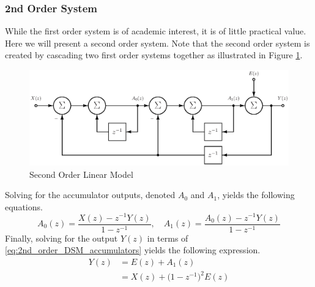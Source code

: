 \subsubsection{2nd Order System}
While the first order system is of academic interest, it is of little
practical value. Here we will present a second order system. Note that the
second order system is created by cascading two first order systems
together as illustrated in Figure \ref{fig:linear_z_model_2nd_order}.
\begin{figure}
  \centering
  \includegraphics[width=\textwidth]{./final_figures/second_order_simple_model.eps}
  \caption{Second Order Linear Model}
  \label{fig:linear_z_model_2nd_order}
\end{figure}
Solving for the accumulator outputs, denoted $A_{0}$ and $A_{1}$, yields the following
equations.
\begin{equation}\label{eq:2nd_order_DSM_accumulators}
  A_{0}(z) = \frac{X(z)-z^{-1}Y(z)}{1-z^{-1}} ,\quad
  A_{1}(z) = \frac{A_{0}(z)-z^{-1}Y(z)}{1-z^{-1}}
\end{equation}
Finally, solving for the output $Y(z)$ in terms of \eqref{eq:2nd_order_DSM_accumulators}
yields the following expression.
\begin{equation}\label{eq:2nd_order_DSM_output}
 \begin{split}
  Y(z) &= E(z)+A_1(z) \\
       &= X(z)+ \bigl(1-z^{-1}\bigr)^2 E(z)
 \end{split}
\end{equation}

